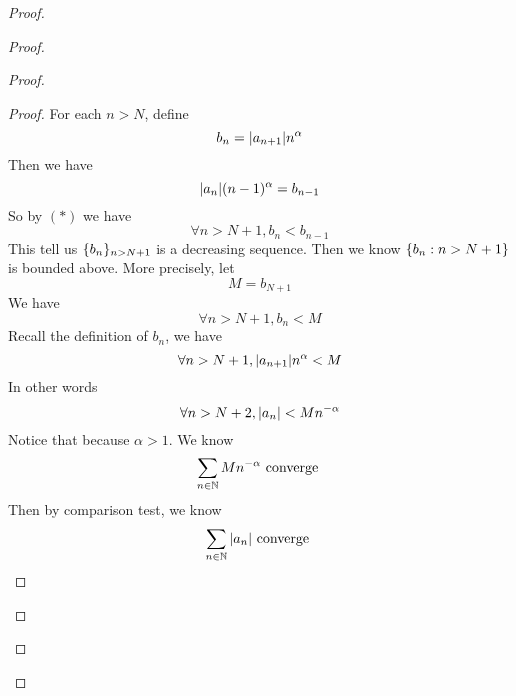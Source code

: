 \documentclass{report}
\begin{document}
\begin{proof}
\begin{proof}
\begin{proof}
\begin{proof}
For each $n>N$, define
 \begin{equation}
b_n=|a_{n+1}|n^{\alpha }
\end{equation}
Then we have
\begin{equation}
|a_n|(n-1)^{\alpha }=b_{n-1}
\end{equation}
So by $(*)$ we have
\begin{equation}
\forall n>N+1, b_n<b_{n-1}
\end{equation}
This tell us $\{ b_n \}_{n>N+1}$ is a decreasing sequence. Then we know $\{ b_n:n>N+1 \}$ is bounded above. More precisely, let
\begin{equation}
M=b_{N+1}
\end{equation}
We have
\begin{equation}
\forall n>N+1, b_n< M
\end{equation}
Recall the definition of $b_n$, we have
 \begin{equation}
\forall n>N+1, |a_{n+1}|n^{\alpha }<M
\end{equation}
In other words
\begin{equation}
\forall n>N+2, |a_n|<Mn^{-\alpha }
\end{equation}
Notice that because $\alpha>1 $. We know 
\begin{equation}
\sum_{n\in\mathbb{N}} Mn^{-\alpha }\text{ converge }
\end{equation}
Then by comparison test, we know
\begin{equation}
\sum_{n\in\mathbb{N}} |a_n|\text{ converge }
\end{equation}

\end{proof}


\end{proof}
\end{proof}
\end{proof}
\end{document}
